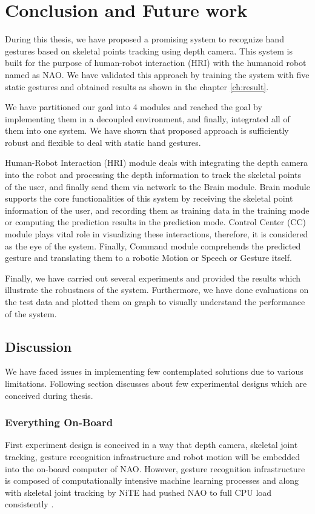 \chapter{Conclusion and Future work} During this thesis, we have proposed a promising system to recognize hand gestures based on skeletal points tracking using depth camera. This system is built for the purpose of human-robot interaction (HRI) with the humanoid robot named as NAO. We have validated this approach by training the system with five static gestures and obtained results as shown in the chapter \ref{ch:result}.

We have partitioned our goal into 4 modules and reached the goal by implementing them in a decoupled environment, and finally, integrated all of them into one system. We have shown that proposed approach is sufficiently robust and flexible to deal with static hand gestures. 

Human-Robot Interaction (HRI) module deals with integrating the depth camera into the robot and processing the depth information to track the skeletal points of the user, and finally send them via network to the Brain module. Brain module supports the core functionalities of this system by receiving the skeletal point information of the user, and recording them as training data in the training mode or computing the prediction results in the prediction mode. Control Center (CC) module plays vital role in visualizing these interactions, therefore, it is considered as the eye of the system. Finally, Command module comprehends the predicted gesture and translating them to a robotic Motion or Speech or Gesture itself.

Finally, we have carried out several experiments and provided the results which illustrate the robustness of the system. Furthermore, we have done evaluations on the test data and plotted them on graph to visually understand the performance of the system. 

\section{Discussion} 
We have faced issues in implementing few contemplated solutions due to various limitations. Following section discusses about few experimental designs which are conceived during thesis.

\subsection*{Everything On-Board} First experiment design is conceived in a way that depth camera, skeletal joint tracking, gesture recognition infrastructure and robot motion will be embedded into the on-board computer of NAO. However, gesture recognition infrastructure is composed of computationally intensive machine learning processes and along with skeletal joint tracking by NiTE had pushed NAO to full CPU load consistently \cite{17}.

